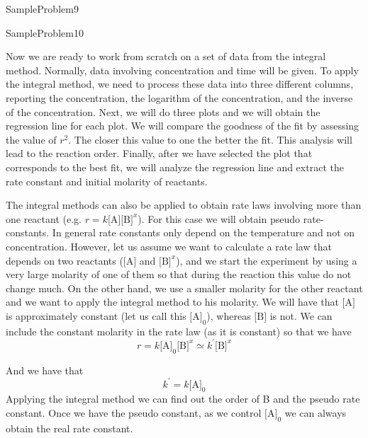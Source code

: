 \documentclass[main.tex]{subfiles}
\newcommand\chapterlabel{Ch-kinetics}
\begin{document}
\begin{description}
  {SampleProblem9}



  {SampleProblem10}



\item[\docfilehook{The integral method in action}{}] 
Now we are ready to work from scratch on a set of data from the integral method. Normally, data involving concentration and time will be given. To apply the integral method, we need to process these data into three different columns, reporting the concentration, the logarithm of the concentration, and the inverse of the concentration. Next, we will do three plots and we will obtain the regression line for each plot. We will compare the goodness of the fit by assessing the value of $r^2$. The closer this value to one the better the fit. This analysis will lead to the reaction order. Finally, after we have selected the plot that corresponds to the best fit, we will analyze the regression line and extract the rate constant and initial molarity of reactants. 

\item[\docfilehook{The integral method for more than one reactant}{}] 
The integral methods can also be applied to obtain rate laws involving more than one reactant (e.g. $r=k\text{[A]}\text{[B]}^x$). For this case we will obtain pseudo rate-constants. In general rate constants only depend on the temperature and not on concentration. However, let us assume we want to calculate a rate law that depends on two reactants ($\text{[A]}$ and $\text{[B]}^x$), and we start the experiment by using a very large molarity of one of them so that during the reaction this value do not change much. On the other hand, we use a smaller molarity for the other  reactant and we want to apply the integral method to his molarity. We will have that $\text{[A]}$ is approximately constant (let us call this $\text{[A]}_0$), whereas $\text{[B]}$ is not. We can include the constant molarity in the rate law (as it is constant) so that we have 
\[r=k\text{[A]}_0\text{[B]}^x \simeq k^\prime \text{[B]}^x\]
\end{description}
And we have that 
\[ k^\prime=k\text{[A]}_0\]
Applying the integral method we can find out the order of B and the pseudo rate constant. Once we have the pseudo constant, as we control $\text{[A]}_0$ we can always obtain the real rate constant.
\end{document}
